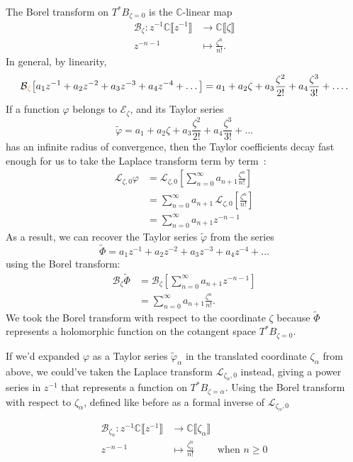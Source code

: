 \documentclass{article}
\theoremstyle{definition}
\newcommand{\maps}{\colon}
\newcommand{\C}{\mathbb{C}}
\newcommand{\series}[1]{\tilde{#1}}
\newcommand{\laplace}{\mathcal{L}}
\newcommand{\borel}{\mathcal{B}}
\begin{document}
The Borel transform on $T^*B_{\zeta = 0}$ is the $\C$-linear map
\begin{align*}
\borel_\zeta \maps z^{-1} \C \llbracket z^{-1} \rrbracket & \to \C \llbracket \zeta \rrbracket \\
z^{-n-1} & \mapsto \frac{\zeta^n}{n!}.
\end{align*}
In general, by linearity,
\begin{align*}
\borel\textcolor{orange}{_\zeta}\big[a_1 z^{-1} + a_2 z^{-2} + a_3 z^{-3} + a_4 z^{-4} + \ldots \big] = a_1 + a_2 \zeta + a_3 \frac{\zeta^2}{2!} + a_4 \frac{\zeta^3}{3!} + \ldots.
\end{align*}
If a function $\varphi$ belongs to $\mathcal{E}_\zeta$, and its Taylor series
\[ \series{\varphi} = a_1 + a_2 \zeta + a_3 \frac{\zeta^2}{2!} + a_4 \frac{\zeta^3}{3!} + \ldots \]
has an infinite radius of convergence, then the Taylor coefficients decay fast enough for us to take the Laplace transform term by term~\cite[Theorem 5.20]{diverg-resurg-i}:
\begin{align*}
  \laplace_{\zeta, 0}\varphi&=\laplace_{\zeta,0}\left[\sum_{n=0}^\infty a_{n+1}\frac{\zeta^n}{n!}\right]\\
  &=\sum_{n=0}^\infty a_{n+1}\,\laplace_{\zeta,0}\left[\frac{\zeta^n}{n!}\right]\\
  &=\sum_{n=0}^\infty a_{n+1}z^{-n-1}
\end{align*}
As a result, we can recover the Taylor series $\series{\varphi}$ from the series
\[ \series{\Phi} = a_1 z^{-1} + a_2 z^{-2} + a_3 z^{-3} + a_4 z^{-4} + \ldots \]
using the Borel transform:
\begin{align*}
\borel_\zeta \series{\Phi}&=\borel_\zeta\left[\sum_{n=0}^\infty a_{n+1}z^{-n-1}\right]\\
&=\sum_{n=0}^\infty a_{n+1}\frac{\zeta^n}{n!}.
\end{align*}
We took the Borel transform with respect to the coordinate $\zeta$ because $\series{\Phi}$ represents a holomorphic function on the cotangent space $T^*B_{\zeta = 0}$.

If we'd expanded $\varphi$ as a Taylor series $\series{\varphi}_\alpha$ in the translated coordinate $\zeta_\alpha$ from above, we could've taken the Laplace transform $\laplace_{\zeta_\alpha,0}$ instead, giving a power series in $z^{-1}$ that represents a function on $T^*B_{\zeta = \alpha}$. Using the Borel transform with respect to $\zeta_\alpha$, defined like before as a formal inverse of $\laplace_{\zeta_\alpha,0}$

\begin{align*}
     \borel_{\zeta_\alpha}\colon z^{-1}\C\llbracket z^{-1}\rrbracket &\to \C\llbracket \zeta_\alpha \rrbracket  \\
     z^{-n-1}& \mapsto \frac{\zeta_\alpha^n}{n!} \qquad \text{ when } n\geq 0
 \end{align*}
\end{document}
